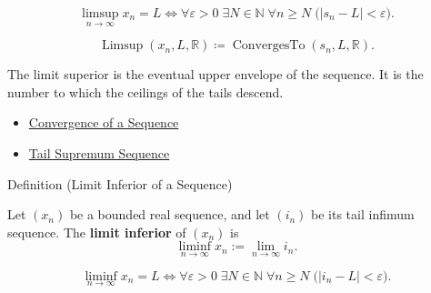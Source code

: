 \begin{remark*}
\[
\limsup_{n\to\infty}x_n=L
\Longleftrightarrow
\forall \varepsilon>0\;\exists N\in\mathbb{N}\;\forall n\ge N
\;\bigl(|s_n-L|<\varepsilon\bigr).
\]
\end{remark*}

\begin{remark*}
\[
\operatorname{Limsup}(x_n,L,\mathbb{R})
\coloneqq
\operatorname{ConvergesTo}(s_n,L,\mathbb{R}).
\]
\end{remark*}

\begin{remark*}[Interpretation]
The limit superior is the eventual upper envelope of the sequence. It is the
number to which the ceilings of the tails descend.
\end{remark*}

\begin{dependencies}
\begin{itemize}
  \item \hyperref[def:convergent-sequence]{Convergence of a Sequence}
  \item \hyperref[def:tail-supremum-sequence]{Tail Supremum Sequence}
\end{itemize}
\end{dependencies}


\begin{definitionbox}{Definition (Limit Inferior of a Sequence)}
\begin{definition}
\label{def:liminf-sequence}
Let $(x_n)$ be a bounded real sequence, and let $(i_n)$ be its tail
infimum sequence. The \textbf{limit inferior} of $(x_n)$ is
\[
  \liminf_{n\to\infty}x_n:=\lim_{n\to\infty}i_n.
\]
\end{definition}
\end{definitionbox}

\begin{remark*}
\[
\liminf_{n\to\infty}x_n=L
\Longleftrightarrow
\forall \varepsilon>0\;\exists N\in\mathbb{N}\;\forall n\ge N
\;\bigl(|i_n-L|<\varepsilon\bigr).
\]
\end{remark*}

